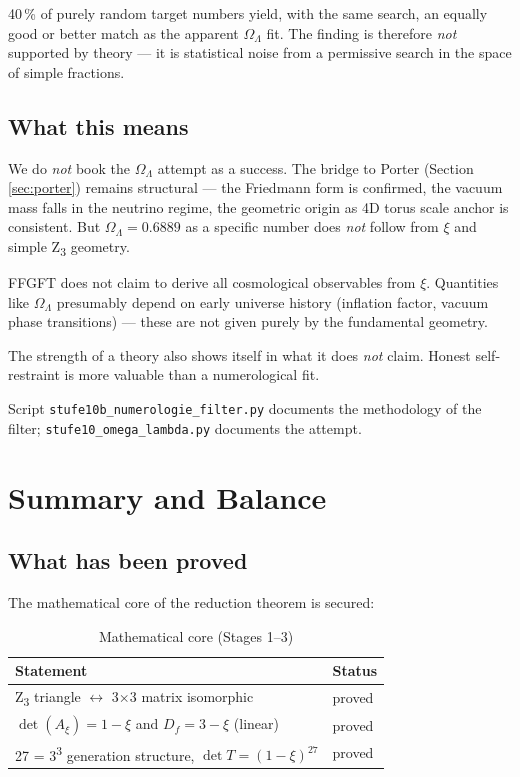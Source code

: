 \begin{important}
40\,\% of purely random target numbers yield, with the same search, an equally good or better match as the apparent \(\Omega_\Lambda\) fit. The finding is therefore \emph{not} supported by theory --- it is statistical noise from a permissive search in the space of simple fractions.
\end{important}

\subsection{What this means}

We do \emph{not} book the \(\Omega_\Lambda\) attempt as a success. The bridge to Porter (Section \ref{sec:porter}) remains structural --- the Friedmann form is confirmed, the vacuum mass falls in the neutrino regime, the geometric origin as 4D torus scale anchor is consistent. But \(\Omega_\Lambda = 0.6889\) as a specific number does \emph{not} follow from \(\xi\) and simple Z\textsubscript{3} geometry.

\begin{philosophical}
FFGFT does not claim to derive all cosmological observables from \(\xi\). Quantities like \(\Omega_\Lambda\) presumably depend on early universe history (inflation factor, vacuum phase transitions) --- these are not given purely by the fundamental geometry.

The strength of a theory also shows itself in what it does \emph{not} claim. Honest self-restraint is more valuable than a numerological fit.
\end{philosophical}

Script \texttt{stufe10b\_numerologie\_filter.py} documents the methodology of the filter; \texttt{stufe10\_omega\_lambda.py} documents the attempt.

\section{Summary and Balance}
\label{sec:bilanz}

\subsection{What has been proved}

The mathematical core of the reduction theorem is secured:

\begin{table}[h]
\centering
\caption{Mathematical core (Stages 1--3)}
\begin{tabular}{ll}
\toprule
Statement & Status \\
\midrule
Z\textsubscript{3} triangle \(\leftrightarrow\) 3$\times$3 matrix isomorphic & proved \\
\(\det(A_\xi) = 1 - \xi\) and \(D_f = 3 - \xi\) (linear) & proved \\
27 = 3\textsuperscript{3} generation structure, \(\det T = (1-\xi)^{27}\) & proved \\
\bottomrule
\end{tabular}
\end{table}

